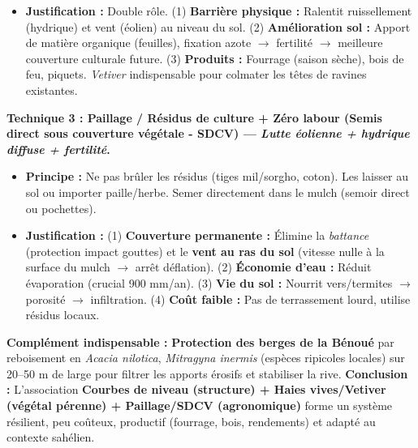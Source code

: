 \documentclass[11pt]{article}
\begin{document}
\begin{exoresolu}
\begin{itemize}
        \item \textbf{Justification :} Double rôle. (1) \textbf{Barrière physique :} Ralentit ruissellement (hydrique) et vent (éolien) au niveau du sol. (2) \textbf{Amélioration sol :} Apport de matière organique (feuilles), fixation azote $\rightarrow$ fertilité $\rightarrow$ meilleure couverture culturale future. (3) \textbf{Produits :} Fourrage (saison sèche), bois de feu, piquets. \emph{Vetiver} indispensable pour colmater les têtes de ravines existantes.
    \end{itemize}
    \textbf{Technique 3 : Paillage / Résidus de culture + Zéro labour (Semis direct sous couverture végétale - SDCV) — \emph{Lutte éolienne + hydrique diffuse + fertilité}.}
    \begin{itemize}
        \item \textbf{Principe :} Ne pas brûler les résidus (tiges mil/sorgho, coton). Les laisser au sol ou importer paille/herbe. Semer directement dans le mulch (semoir direct ou pochettes).
        \item \textbf{Justification :} (1) \textbf{Couverture permanente :} Élimine la \emph{battance} (protection impact gouttes) et le \textbf{vent au ras du sol} (vitesse nulle à la surface du mulch $\rightarrow$ arrêt déflation). (2) \textbf{Économie d'eau :} Réduit évaporation (crucial 900 mm/an). (3) \textbf{Vie du sol :} Nourrit vers/termites $\rightarrow$ porosité $\rightarrow$ infiltration. (4) \textbf{Coût faible :} Pas de terrassement lourd, utilise résidus locaux.
    \end{itemize}
    \textbf{Complément indispensable :} \textbf{Protection des berges de la Bénoué} par reboisement en \emph{Acacia nilotica}, \emph{Mitragyna inermis} (espèces ripicoles locales) sur 20–50 m de large pour filtrer les apports érosifs et stabiliser la rive.
    \vspace{0,2cm}
    \textbf{Conclusion :} L'association \textbf{Courbes de niveau (structure) + Haies vives/Vetiver (végétal pérenne) + Paillage/SDCV (agronomique)} forme un système résilient, peu coûteux, productif (fourrage, bois, rendements) et adapté au contexte sahélien.
\end{exoresolu}
\end{document}
